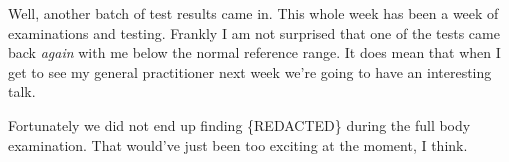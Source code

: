 Well, another batch of test results came in. This whole week has been a
week of examinations and testing. Frankly I am not surprised that one of
the tests came back \emph{again} with me below the normal reference
range. It does mean that when I get to see my general practitioner next
week we're going to have an interesting talk.

Fortunately we did not end up finding \{REDACTED\} during the full body
examination. That would've just been too exciting at the moment, I
think.
